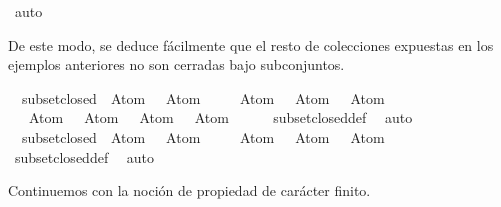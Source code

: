 \begin{isabellebody}
\ auto%
\endisatagproof
{\isafoldproof}%
%
\isadelimproof
%
\endisadelimproof
%
\begin{isamarkuptext}%
De este modo, se deduce fácilmente que el resto de colecciones expuestas en los ejemplos
  anteriores no son cerradas bajo subconjuntos.%
\end{isamarkuptext}\isamarkuptrue%
\isamarkupfalse%
\ {\isachardoublequoteopen}{\isasymnot}\ subset{\isacharunderscore}closed\ {\isacharbraceleft}{\isacharbraceleft}{\isacharparenleft}\isactrlbold {\isasymnot}\ {\isacharparenleft}Atom\ {}{\isacharparenright}{\isacharparenright}\ \isactrlbold {\isasymrightarrow}\ Atom\ {}{\isacharbraceright}{\isacharcomma}\isanewline
\ \ \ {\isacharbraceleft}{\isacharparenleft}{\isacharparenleft}\isactrlbold {\isasymnot}\ {\isacharparenleft}Atom\ {}{\isacharparenright}{\isacharparenright}\ \isactrlbold {\isasymrightarrow}\ Atom\ {}{\isacharparenright}{\isacharcomma}\ \isactrlbold {\isasymnot}{\isacharparenleft}\isactrlbold {\isasymnot}\ {\isacharparenleft}Atom\ {}{\isacharparenright}{\isacharparenright}{\isacharbraceright}{\isacharcomma}\isanewline
\ \ {\isacharbraceleft}{\isacharparenleft}{\isacharparenleft}\isactrlbold {\isasymnot}\ {\isacharparenleft}Atom\ {}{\isacharparenright}{\isacharparenright}\ \isactrlbold {\isasymrightarrow}\ Atom\ {}{\isacharparenright}{\isacharcomma}\ \isactrlbold {\isasymnot}{\isacharparenleft}\isactrlbold {\isasymnot}\ {\isacharparenleft}Atom\ {}{\isacharparenright}{\isacharparenright}{\isacharcomma}\ \ Atom\ {}{\isacharbraceright}{\isacharbraceright}{\isachardoublequoteclose}\ \isanewline
%
\isadelimproof
\ \ %
\endisadelimproof
%
\isatagproof
{}\isamarkupfalse%
\ subset{\isacharunderscore}closed{\isacharunderscore}def\ \isamarkupfalse%
\ auto%
\endisatagproof
{\isafoldproof}%
%
\isadelimproof
\isanewline
%
\endisadelimproof
\isanewline
{}\isamarkupfalse%
\ {\isachardoublequoteopen}{\isasymnot}\ subset{\isacharunderscore}closed\ {\isacharbraceleft}{\isacharbraceleft}{\isacharparenleft}\isactrlbold {\isasymnot}\ {\isacharparenleft}Atom\ {}{\isacharparenright}{\isacharparenright}\ \isactrlbold {\isasymrightarrow}\ Atom\ {}{\isacharbraceright}{\isacharcomma}\isanewline
\ \ \ {\isacharbraceleft}{\isacharparenleft}{\isacharparenleft}\isactrlbold {\isasymnot}\ {\isacharparenleft}Atom\ {}{\isacharparenright}{\isacharparenright}\ \isactrlbold {\isasymrightarrow}\ Atom\ {}{\isacharparenright}{\isacharcomma}\ \isactrlbold {\isasymnot}{\isacharparenleft}\isactrlbold {\isasymnot}\ {\isacharparenleft}Atom\ {}{\isacharparenright}{\isacharparenright}{\isacharbraceright}{\isacharbraceright}{\isachardoublequoteclose}\ \isanewline
%
\isadelimproof
\ \ %
\endisadelimproof
%
\isatagproof
{}\isamarkupfalse%
\ subset{\isacharunderscore}closed{\isacharunderscore}def\ \isamarkupfalse%
\ auto%
\endisatagproof
{\isafoldproof}%
%
\isadelimproof
%
\endisadelimproof
%
\begin{isamarkuptext}%
Continuemos con la noción de propiedad de carácter finito.


\end{isamarkuptext}
\end{isabellebody}
